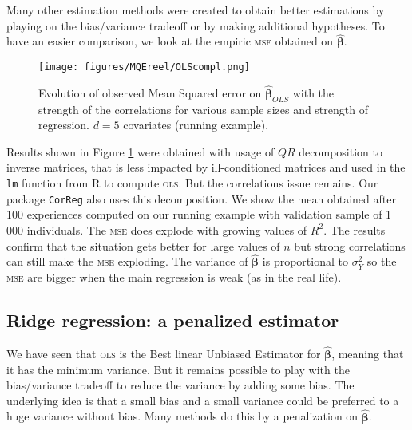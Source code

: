 \documentclass[12pt,a4paper]{report}
\begin{document}
	
	
	Many other estimation methods were created to obtain better estimations by playing on the bias/variance tradeoff or by making additional hypotheses.
	To have an easier comparison, we look at the empiric \textsc{mse} obtained on $\hat{\boldsymbol{\beta}}$.
		\\
	
	 \begin{figure}
	 \centering
	  \texttt{[image: figures/MQEreel/OLScompl.png]}
	  \caption{Evolution of observed Mean Squared error on $\hat{\boldsymbol{\beta}}_{OLS}$ with the strength of the correlations for various sample sizes and strength of regression. $d=5$ covariates (running example). } \label{MQEOLScompl}
	\end{figure}	
	Results shown in Figure \ref{MQEOLScompl} were obtained with usage of $QR$ decomposition to inverse matrices, that is less impacted by ill-conditioned matrices \cite{bulirsch2002introduction} and used in the {\tt lm} function from R to compute \textsc{ols}. But the correlations issue remains. Our package {\tt CorReg} also uses this decomposition.
	 We show the mean obtained after 100 experiences computed on our running example with validation sample of 1 000 individuals. The \textsc{mse} does explode with growing values of $R^2$. The results confirm that the situation gets better for large values of $n$ but strong correlations can still make the \textsc{mse} exploding. The variance of $\hat{\boldsymbol{\beta}}$ is proportional to $\sigma_Y^2$ so the \textsc{mse} are bigger when the main regression is weak (as in the real life).
	\\
	
		 \FloatBarrier
		

	\subsection{Ridge regression: a penalized estimator}
	
	We have seen that \textsc{ols} is the Best linear Unbiased Estimator for $\hat{\boldsymbol{\beta}}$, meaning that it has the minimum variance. But it remains possible to play with the bias/variance tradeoff to reduce the variance by adding some bias. The underlying idea is that a small bias and a small variance could be preferred to a huge variance without bias. Many methods do this by a penalization on  $\hat{\boldsymbol{\beta}}$.  %
\end{document}
